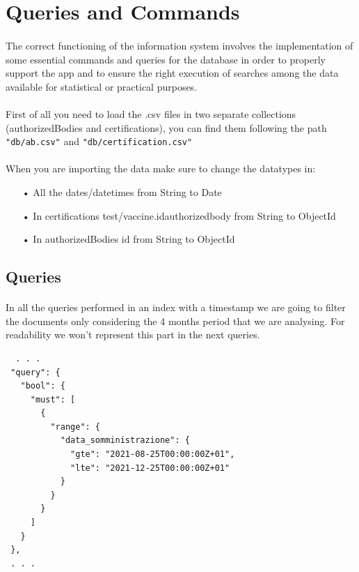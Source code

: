 \documentclass[a4paper,12pt]{article}
\begin{document}
\section{Queries and Commands}
\paragraph{} The correct functioning of the information system involves the implementation of some essential commands and queries for the database in order to properly support the app and to ensure the right execution of searches among the data available for statistical or practical purposes. \par
\paragraph{} First of all you need to load the .csv files in two separate collections (authorizedBodies and certifications), you can find them following the path \texttt{"db/ab.csv"} and \texttt{"db/certification.csv"}
\paragraph{}When you are importing the data make sure to change the datatypes in:
\begin{itemize}
\item[•] All the dates/datetimes from String to Date
\item[•] In certifications test/vaccine.id\textunderscore authorized\textunderscore body from String to ObjectId
\item[•] In authorizedBodies \textunderscore id from String to ObjectId
\end{itemize}

\subsection{Queries}
\paragraph{} In all the queries performed in an index with a timestamp we are going to filter the documents only considering the 4 months period that we are analysing. For readability we won't represent this part in the next queries.
\begin{tcolorbox}[colback=pink!5!white,colframe=pink!75!black,title=FILTER]
\begin{verbatim}
  . . .
 "query": {
   "bool": {
     "must": [
       {
         "range": {
           "data_somministrazione": {
             "gte": "2021-08-25T00:00:00Z+01",
             "lte": "2021-12-25T00:00:00Z+01"
           }
         }
       }
     ]
   }
 },
 . . .
\end{verbatim}
\end{tcolorbox}
\end{document}
